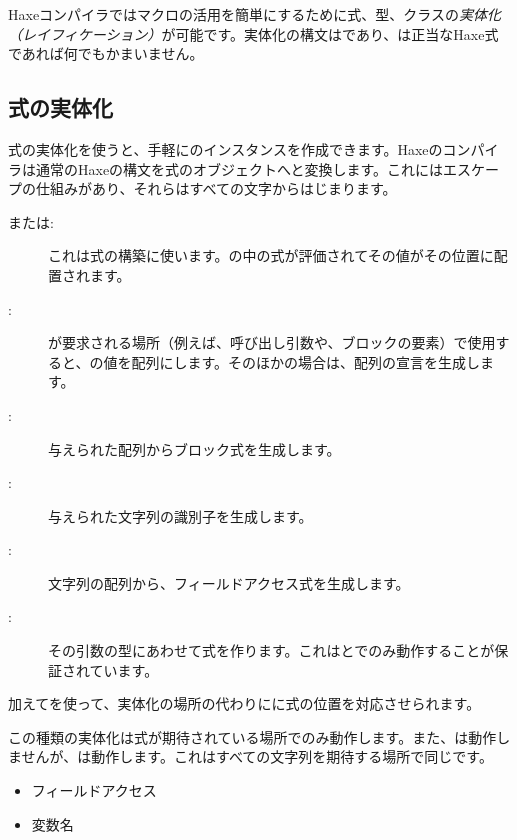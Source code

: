 Haxeコンパイラではマクロの活用を簡単にするために式、型、クラスの\emph{実体化（レイフィケーション）}が可能です。実体化の構文はであり、は正当なHaxe式であれば何でもかまいません。

\subsection{式の実体化}
\label{macro-reification-expression}

式の実体化を使うと、手軽にのインスタンスを作成できます。Haxeのコンパイラは通常のHaxeの構文を式のオブジェクトへと変換します。これにはエスケープの仕組みがあり、それらはすべて\expr{\$}の文字からはじまります。

\begin{description}
	\item[\expr{\$\{\}}または:]  これは式の構築に使います。\expr{\{ \}}の中の式が評価されてその値がその位置に配置されます。
	\item[:]  が要求される場所（例えば、呼び出し引数や、ブロックの要素）で使用すると、の値を配列にします。そのほかの場合は、配列の宣言を生成します。
	\item[:]  与えられた配列からブロック式を生成します。
	\item[:]  与えられた文字列の識別子を生成します。
	\item[:]  文字列の配列から、フィールドアクセス式を生成します。
	\item[:]  その引数の型にあわせて式を作ります。これはとでのみ動作することが保証されています。
\end{description}

加えてを使って、実体化の場所の代わりにに式の位置を対応させられます。

この種類の実体化は式が期待されている場所でのみ動作します。また、は動作しませんが、は動作します。これはすべての文字列を期待する場所で同じです。

\begin{itemize}
	\item フィールドアクセス 
	\item 変数名 
\end{itemize}

